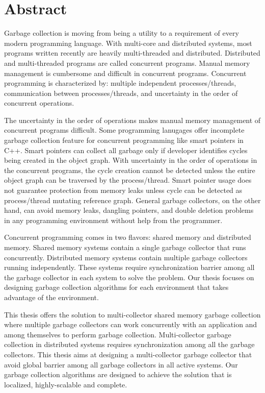 \chapter*{Abstract}
\label{ch:abstract}
Garbage collection is moving from being a utility to a requirement of every modern programming language. 
With multi-core and distributed systems, most programs written recently are heavily multi-threaded and distributed. Distributed and multi-threaded programs are called concurrent programs. Manual memory management is cumbersome and difficult in concurrent programs.  Concurrent programming is characterized by: multiple independent processes/threads, communication between processes/threads, and uncertainty in the order of concurrent operations.

The uncertainty in the order of operations makes manual memory management of concurrent programs difficult. Some programming lanugages offer incomplete garbage collection feature for concurrent programming like smart pointers in C++.
Smart pointers can collect all garbage only if developer identifies cycles being created in the object graph. With uncertainty in the order of operations in the concurrent programs, the cycle creation cannot be detected unless the entire object graph can be traversed by the process/thread.
 Smart pointer usage does not guarantee protection from memory leaks unless cycle can be detected as process/thread mutating reference graph.
 General garbage collectors, on the other hand, can avoid memory leaks, dangling pointers, and double deletion problems in any programming environment without help from the programmer. 

Concurrent programming comes in two flavors: shared memory and distributed memory. Shared memory systems contain a single garbage collector that runs concurrently. Distributed memory systems contain multiple garbage collectors running independently. These systems require synchronization barrier among all the garbage collector in each system to solve the problem. Our thesis focuses on designing garbage collection algorithms for each environment that takes advantage of the environment. 

This thesis offers the solution to multi-collector shared memory garbage collection where multiple garbage collectors can work concurrently with an application and among themselves to perform garbage collection. Multi-collector garbage collection in distributed systems requires synchronization among all the garbage collectors. This thesis aims at designing a multi-collector garbage collector that avoid global barrier among all garbage collectors in all active systems. Our garbage collection algorithms are designed to achieve the solution that is localized, highly-scalable and complete.
